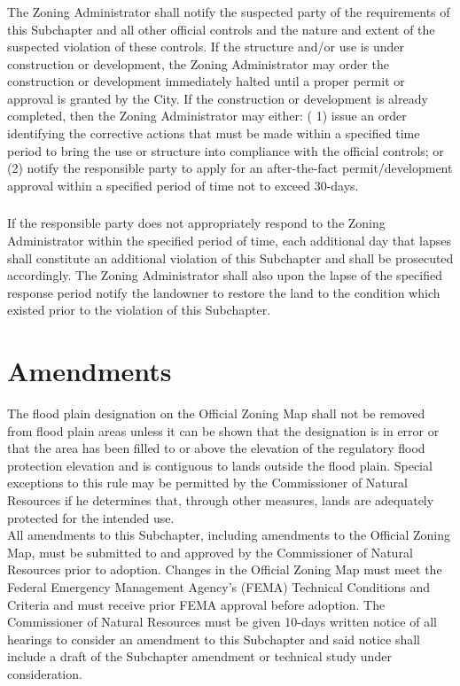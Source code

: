 \subsubsection{}
The Zoning Administrator shall notify the suspected party of the requirements of this Subchapter and all other official controls and the nature and extent of the suspected violation of these controls. If the structure and/or use is under construction or development, the Zoning Administrator may order the construction or development immediately halted until a proper permit or approval is granted by the City. If the construction or development is already completed, then the Zoning Administrator may either: ( 1) issue an order identifying the corrective actions that must be made within a specified time period to bring the use or structure into compliance with the official controls; or (2) notify the responsible party to apply for an after-the-fact permit/development approval within a specified period of time not to exceed 30-days.
\subsubsection{}
If the responsible party does not appropriately respond to the Zoning Administrator within the specified period of time, each additional day that lapses shall constitute an additional violation of this Subchapter and shall be prosecuted accordingly. The Zoning Administrator shall also upon the lapse of the specified response period notify the landowner to restore the land to the condition which existed prior to the violation of this Subchapter.
\section{Amendments}
The flood plain designation on the Official Zoning Map shall not be removed from flood plain areas unless it can be shown that the designation is in error or that the area has been filled to or above the elevation of the regulatory flood protection elevation and is contiguous to lands outside the flood plain. Special exceptions to this rule may be permitted by the Commissioner of Natural Resources if he determines that, through other measures, lands are adequately protected for the intended use.\\
All amendments to this Subchapter, including amendments to the Official Zoning Map, must be submitted to and approved by the Commissioner of Natural Resources prior to adoption. Changes in the Official Zoning Map must meet the Federal Emergency Management Agency's (FEMA) Technical Conditions and Criteria and must receive prior FEMA approval before adoption. The Commissioner of Natural Resources must be given 10-days written notice of all hearings to consider an amendment to this Subchapter and said notice shall include a draft of the Subchapter amendment or technical study under consideration.

